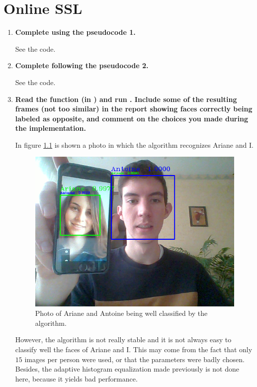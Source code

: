 \documentclass[a4paper, 11pt]{report}
\begin{document}
\pagebreak
\chapter{Online SSL}

\begin{enumerate}
	\item \textbf{Complete  using the pseudocode 1.}
    
    See the code.

	\item \textbf{Complete  following the pseudocode 2.}

    See the code.

	\item \textbf{Read the function  (in ) and run . Include some of the resulting frames (not too similar)
	in the report showing faces correctly being labeled as opposite, and comment on the choices you made during the implementation.}
	
	In figure \ref{fig:ariane-antoine} is shown a photo in which the algorithm recognizes Ariane and I.
	
	\begin{figure}[!h]
	    \centering
	    \includegraphics[width=.5\textwidth]{images/q33_ariane_antoine.png}
	    \caption{Photo of Ariane and Antoine being well classified by the algorithm.}
	    \label{fig:ariane-antoine}
	\end{figure}
	
	However, the algorithm is not really stable and it is not always easy to classify well the faces of Ariane and I. This may come from the fact that only $15$ images per person were used, or that the parameters were badly chosen. Besides, the adaptive histogram equalization made previously is not done here, because it yields bad performance.
	

\end{enumerate}
\end{document}
